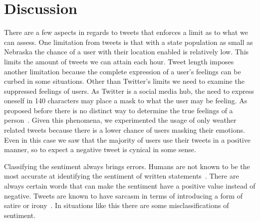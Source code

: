 \chapter{Discussion}

%
%

There are a few aspects in regards to tweets that enforces a limit as to what we can assess. One limitation from tweets is that with a state population as small as Nebraska the chance of a user with their location enabled is relatively low. This limits the amount of tweets we can attain each hour. Tweet length imposes another limitation because the complete expression of a user's feelings can be curbed in some situations. Other than Twitter's limits we need to examine the suppressed feelings of users. As Twitter is a social media hub, the need to express oneself in 140 characters may place a mask to what the user may be feeling. As proposed before there is no distinct way to determine the true feelings of a person~\cite{hannak2012tweetin}. Given this phenomena, we experimented the usage of only weather related tweets because there is a lower chance of users masking their emotions. Even in this case we saw that the majority of users use their tweets in a positive manner, so to expect a negative tweet is cynical in some sense.

Classifying the sentiment always brings errors. Humans are not known to be the most accurate at identifying the sentiment of written statements~\cite{pangthumbs}. %
There are always certain words that can make the sentiment have a positive value instead of negative. Tweets are known to have sarcasm in terms of introducing a form of satire or irony~\cite{riloff2013sarcasm}. In situations like this there are some misclassifications of sentiment.


